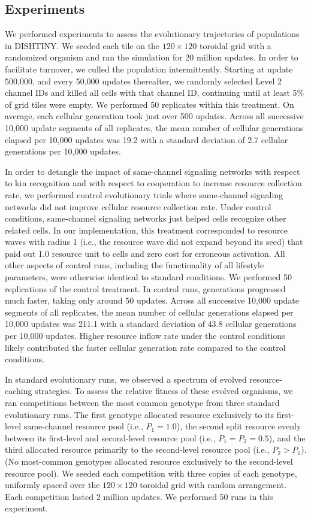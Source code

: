 {\subsection{Experiments}

We performed experiments to assess the evolutionary trajectories of populations in DISHTINY.
We seeded each tile on the $120 \times 120$ toroidal grid with a randomized organism and ran the simulation for 20 million updates.
In order to facilitate turnover, we culled the population intermittently.
Starting at update 500,000, and every 50,000 updates thereafter, we randomly selected Level 2 channel IDs and killed all cells with that channel ID, continuing until at least 5\% of grid tiles were empty.
We performed 50 replicates within this treatment.
On average, each cellular generation took just over 500 updates.
Across all successive 10,000 update segments of all replicates, the mean number of cellular generations elapsed per 10,000 updates was 19.2 with a standard deviation of 2.7 cellular generations per 10,000 updates.

In order to detangle the impact of same-channel signaling networks with respect to kin recognition and with respect to cooperation to increase resource collection rate, we performed control evolutionary trials where same-channel signaling networks did not improve cellular resource collection rate.
Under control conditions, same-channel signaling networks just helped cells recognize other related cells.
In our implementation, this treatment corresponded to resource waves with radius 1 (i.e., the resource wave did not expand beyond its seed) that paid out 1.0 resource unit to cells and zero cost for erroneous activation.
All other aspects of control runs, including the functionality of all lifestyle parameters, were otherwise identical to standard conditions.
We performed 50 replications of the control treatment.
In control runs, generations progressed much faster, taking only around 50 updates.
Across all successive 10,000 update segments of all replicates, the mean number of cellular generations elapsed per 10,000 updates was 211.1 with a standard deviation of 43.8 cellular generations per 10,000 updates.
Higher resource inflow rate under the control conditions likely contributed the faster cellular generation rate compared to the control conditions.

In standard evolutionary runs, we observed a spectrum of evolved resource-caching strategies.
To assess the relative fitness of these evolved organisms, we ran competitions between the most common genotype from three standard evolutionary runs.
The first genotype allocated resource exclusively to its first-level same-channel resource pool (i.e., $P_{1} = 1.0$), the second split resource evenly between its first-level and second-level resource pool (i.e., $P_{1} = P_{2} = 0.5$), and the third allocated resource primarily to the second-level resource pool (i.e., $P_{2} > P_{1}$).
(No most-common genotypes allocated resource exclusively to the second-level resource pool).
We seeded each competition with three copies of each genotype, uniformly spaced over the $120 \times 120$ toroidal grid with random arrangement.
Each competition lasted 2 million updates.
We performed 50 runs in this experiment.

}
